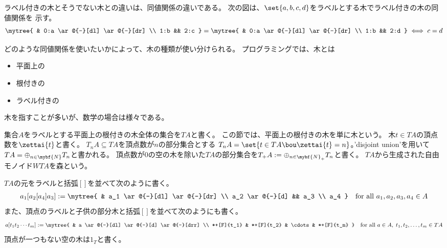 		ラベル付きの木とそうでない木との違いは、同値関係の違いである。
		次の図は、$\set{a,b,c,d}$をラベルとする木でラベル付きの木の同値関係を
		示す。
		\begin{equation*}\begin{split} %
			\mytree{
				& 0:a \ar@{-}[dl] \ar@{-}[dr] \\
				1:b && 2:c
			} = \mytree{
				& 0:a \ar@{-}[dl] \ar@{-}[dr] \\
				1:b && 2:d
			} \iff c = d \\
		\end{split}\end{equation*} %

		どのような同値関係を使いたいかによって、木の種類が使い分けられる。
		プログラミングでは、木とは
		\begin{itemize}\setlength{\itemsep}{-1mm} %
			\item 平面上の
			\item 根付きの
			\item ラベル付きの
		\end{itemize} %
		木を指すことが多いが、数学の場合は様々である。

		集合$A$をラベルとする平面上の根付きの木全体の集合を$TA$と書く。
		この節では、平面上の根付きの木を単に木という。
		木$t\in TA$の頂点数を$\zettai{t}$と書く。
		$T_nA\subseteq TA$を頂点数が$n$の部分集合とする
		$T_nA=\set{t\in TA\bou \zettai{t}=n}$。'disjoint union'を用いて$
		TA=\oplus_{n\in\mybf{N}}T_n$と書かれる。
		頂点数が$0$の空の木を除いた$TA$の部分集合を$
		T_+A:=\oplus_{n\in\mybf{N}_+}T_n$と書く。
		$TA$から生成された自由モノイド$WTA$を森という。

		$TA$の元をラベルと括弧$[]$を並べて次のように書く。
		\begin{equation*}\begin{split} %
			a_1[a_2[a_4]a_3] := \mytree{
				& a_1 \ar@{-}[dl] \ar@{-}[dr] \\
				a_2 \ar@{-}[d] && a_3 \\
				a_4
			}\quad\text{for all }a_1,a_2,a_3,a_4\in A
		\end{split}\end{equation*} %
		また、頂点のラベルと子供の部分木と括弧$[]$を並べて次のようにも書く。
		\begin{equation*}\begin{split} %
			a[t_1t_2\cdots t_m] := \mytree{
				& a \ar@{-}[dl] \ar@{-}[d] \ar@{-}[drr] \\
				*+[F]{t_1} & *+[F]{t_2} & \cdots & *+[F]{t_m}
			}\quad\text{for all }a\in A,\;t_1,t_2,\dots,t_m\in TA
		\end{split}\end{equation*} %
		頂点が一つもない空の木は$1_T$と書く。

